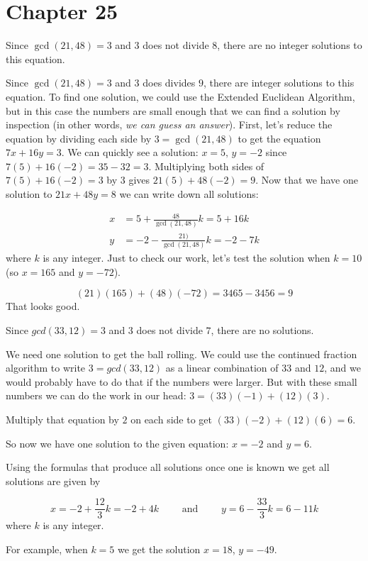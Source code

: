    \section*{Chapter 25}
    
\begin{Solution}{25.1}

Since $\gcd(21,48) = 3$ and $3$ does not divide $8$, there are no integer solutions to this equation. 

\end{Solution}

\begin{Solution}{25.2}

Since $\gcd(21,48) = 3$ and $3$ does  divides $9$, there are integer solutions to this equation.
To find one solution, we could use the Extended Euclidean Algorithm, but in this case the numbers are small
enough that we can find a solution by inspection (in other words, {\it we can guess an answer}). First, let's reduce the equation by dividing each side by $3 = \gcd(21,48)$ to get the equation $7x+16y = 3$. We can quickly see a solution: $x=5,\,y = -2$  since $7(5) + 16(-2) = 35 - 32 = 3$. Multiplying both sides of $7(5)+ 16(-2) = 3$ by $3$ gives
$21(5) + 48(-2) = 9$. Now that we have one solution to $21x+48y = 8$ we can write down all solutions:

\begin{align*}
x & = 5 + \frac{48}{\gcd(21,48)}k = 5 + 16k\\
y &= -2 -\frac{21)}{\gcd(21,48)}k = -2 - 7k
\end{align*}
where $k$ is any integer. Just to check our work, let's test the solution when $k = 10$ (so $x= 165$ and $y = -72$).

\[
(21)(165) + (48)(-72) = 3465- 3456 = 9
\]
That looks good.

\end{Solution}

\begin{Solution}{25.3}
Since $gcd(33,12)=3$ and $3$ does not divide $7$, there are no solutions.
\end{Solution}

\begin{Solution}{25.4}
We need one solution to get the ball rolling.
We could use the continued fraction algorithm to write $3 = gcd(33,12)$
as a linear combination of $33$ and $12$, and we would probably have to
do that if the numbers were larger. But with these small numbers we can
do the work in our head: $3 = (33)(-1) + (12)(3)$.

Multiply that equation by $2$ on each side to get $(33)(-2)+ (12)(6) = 6$.

So now we have one solution to the given equation: $x = -2$ and $y=6$.

Using the formulas that produce all solutions once one is known we get all solutions
are given by

\[
 x = -2 + \frac{12}{3}k =-2+4k\qquad \text{ and }\qquad y = 6 - \frac{33}{3}k=6-11k
 \]
where $k$ is any integer.

For example, when $k=5$ we get the solution $x = 18$, $y = -49$.

\end{Solution}


